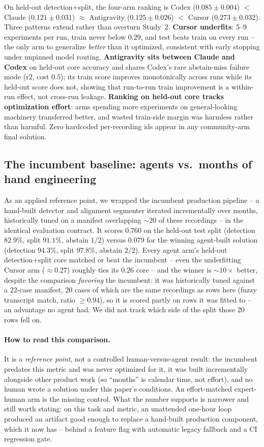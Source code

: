 \documentclass[runningheads]{llncs}
\begin{document}
On held-out detection+split, the four-arm ranking is Codex
($0.085\pm0.004$) $<$ Claude ($0.121\pm0.031$) $\approx$ Antigravity
($0.125\pm0.026$) $<$ Cursor ($0.273\pm0.032$). Three patterns extend rather
than overturn Study~2. \textbf{Cursor underfits}: 5--9 experiments per run,
train never below $0.29$, and test beats train on every run -- the only arm
to generalize \emph{better} than it optimized, consistent with early stopping
under unpinned model routing. \textbf{Antigravity sits between Claude and
Codex} on held-out core accuracy and shares Codex's rare abstain-miss failure
mode (r2, cost $0.5$); its train score improves monotonically across runs
while its held-out score does not, showing that run-to-run train improvement
is a within-run effect, not cross-run leakage. \textbf{Ranking on held-out
core tracks optimization effort}: arms spending more experiments on
general-looking machinery transferred better, and wasted train-side margin
was harmless rather than harmful. Zero hardcoded per-recording ids appear in
any community-arm final solution.

\subsection{The incumbent baseline: agents vs.\ months of hand engineering}
\label{sec:incumbent}
As an applied reference point, we wrapped the incumbent production pipeline
-- a hand-built detector and alignment segmenter iterated incrementally
over months, historically tuned on a manifest overlapping $\sim\!20$ of
these recordings -- in the identical evaluation contract. It scores
$0.760$ on the held-out test split (detection $82.9\%$, split $91.1\%$,
abstain $1/2$) versus $0.079$ for the winning agent-built solution
(detection $94.3\%$, split $97.8\%$, abstain $2/2$). Every agent arm's
held-out detection+split core matched or beat the incumbent -- even the
underfitting Cursor arm ($\approx\!0.27$) roughly ties its $0.26$ core --
and the winner is $\sim\!10\times$ better, despite the comparison
\emph{favoring} the incumbent: it was historically tuned against a 22-case
manifest, 20 cases of which are the same recordings as rows here (fuzzy
transcript match, ratio $\geq0.94$), so it is scored partly on rows it was
fitted to -- an advantage no agent had. We did not track which side of the
split those 20 rows fell on.

\paragraph{How to read this comparison.} It is a \emph{reference point}, not
a controlled human-versus-agent result: the incumbent predates this metric
and was never optimized for it, it was built incrementally alongside other
product work (so ``months'' is calendar time, not effort), and no human
wrote a solution under this paper's conditions. An effort-matched
expert-human arm is the missing control. What the number supports is
narrower and still worth stating: on this task and metric, an unattended
one-hour loop produced an artifact good enough to replace a hand-built
production component, which it now has -- behind a feature flag with
automatic legacy fallback and a CI regression gate.
\end{document}
